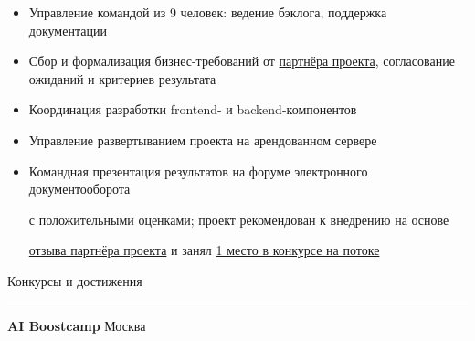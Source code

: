 \documentclass[14pt, a4paper, oneside]{extarticle}
\begin{document}

\begin{itemize}
	\vspace{-2\intextsep}
    \item Управление командой из 9 человек: ведение бэклога, поддержка документации
	\vspace{-0.8\intextsep}
    \item Сбор и формализация бизнес-требований от \href{https://vk.ru/kearkhipov}{партнёра проекта},
    согласование ожиданий и критериев результата
    \vspace{-0.8\intextsep}
    \item Координация разработки frontend- и backend-компонентов
    \vspace{-0.8\intextsep}
    \item Управление развертыванием проекта на арендованном сервере
    \vspace{-0.8\intextsep}
    \item Командная презентация результатов на форуме электронного документооборота
    
    \vspace{-0.5\intextsep}
    с положительными оценками; проект рекомендован к внедрению на основе
    
    \vspace{-0.5\intextsep}
 	\href{https://github.com/Crazy5202/job_application_form/tree/main/portfolio/EDMS/%D0%9E%D1%82%D0%B7%D1%8B%D0%B2_%D0%B2%D0%BD%D0%B5%D0%B4%D1%80%D0%B5%D0%BD%D0%B8%D0%B5.pdf}{отзыва партнёра проекта} и занял \href{https://github.com/Crazy5202/job_application_form/tree/main/portfolio/EDMS/%D0%9F%D0%BE%D0%B1%D0%B5%D0%B4%D0%B8%D1%82%D0%B5%D0%BB%D1%8C_%D0%A6%D0%9A.pdf}{1 место в конкурсе на потоке}
\end{itemize}


\pagebreak


\begin{flushleft}
	\vspace{-\intextsep}
	\large Конкурсы и достижения
\end{flushleft}

\vspace{-0.8\intextsep}
\hrule


\begin{flushleft}
	\vspace{-0.8\intextsep}
	\quad
	\textbf{AI Boostcamp}
	\hfill
	Москва
\end{flushleft}
\end{document}
